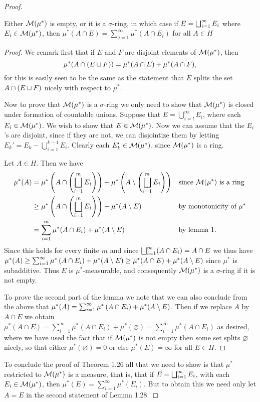\begin{proof}
\begin{lemma}
Either ${\cal M}(\mu^*)$ is empty, or it is a $\sigma$-ring, in which case if $E=\bigsqcup_{i=1}^\infty E_i$ where $E_i\in{\cal M}(\mu^*)$, then $\mu^*(A \cap E)=\sum_{j=1}^\infty \mu^*(A \cap E_i)$ for all ${A} \in {H}$
\end{lemma}
\begin{proof}
We remark first that if $E$ and $F$ are disjoint elements of ${\cal M}(\mu^*)$, then $$\mu^*(A \cap(E \sqcup F))=\mu^*(A \cap E)+\mu^*(A \cap F),$$ for this is easily seen to be the same as the statement that $E$ splits the set $A \cap(E \sqcup F)$ nicely with respect to $\mu^*$.

Now to prove that ${\cal M}(\mu^*)$ is a $\sigma$-ring we only need to show that ${\cal M}(\mu^*)$ is closed under formation of countable unions. Suppose that $E=\bigcup_{i=l}^\infty E_i$, where each $E_i \in {\cal M}(\mu^*)$. We wish to show that $E \in {\cal M}(\mu^*)$. Now we can assume that the $E_i$'s are disjoint, since if they are not, we can disjointize them by letting $E_k'=E_k-\bigcup_{i=1}^{k-1} E_i$. Clearly each $E_{k}' \in {\cal M}(\mu^*)$, since ${\cal M}(\mu^*)$ is a ring.

Let $A \in {H}$. Then we have
\begin{align*}
    \mu^*(A)&=\mu^*\left(A\cap\left(\bigsqcup_{i=1}^mE_i\right)\right)+\mu^*\left(A\setminus\left(\bigsqcup_{i=1}^mE_i\right)\right)& &\text{since }{\cal M}(\mu^*)\text{ is a ring}\\
    &\geq\mu^*\left(A\cap\left(\bigsqcup_{i=1}^mE_i\right)\right)+\mu^*(A\setminus E)& &\text{by monotonicity of }\mu^*\\
    &=\sum_{i=1}^m \mu^*(A \cap E_i)+\mu^*(A\setminus E)& &\text{by lemma 1.}
\end{align*}
Since this holds for every finite $m$ and since $\bigsqcup_{i=1}^\infty(A \cap E_i)=A \cap E$ we thus have $\mu^*(A) \geq \sum_{i=1}^\infty \mu^*\left(A \cap E_i\right)+\mu^*(A\setminus E) \geq \mu^*(A \cap E)+\mu^*(A\setminus E)$ since $\mu^*$ is subadditive. Thus $E$ is $\mu^*$-measurable, and consequently ${\cal M}(\mu^*)$ is a $\sigma$-ring if it is not empty.

To prove the second part of the lemma we note that we can also conclude from the above that $\mu^*(A)=\sum_{i=1}^\infty \mu^*\left(A \cap E_i\right)+\mu^*(A\setminus E)$. Then if we replace $A$ by $A \cap E$ we obtain $\mu^*(A \cap E)=\sum_{i=1}^\infty \mu^*\left(A \cap E_i\right)+\mu^*(\varnothing)=\sum_{i=1}^\infty \mu^*\left(A \cap E_i\right)$ as desired, where we have used the fact that if ${\cal M}(\mu^*)$ is not empty then some set splits $\varnothing$ nicely, so that either $\mu^*(\varnothing)=0$ or else $\mu^*(E)=\infty$ for all $E \in H$.
\end{proof}

To conclude the proof of Theorem 1.26 all that we need to show is that $\mu^*$ restricted to ${\cal M}(\mu^*)$ is a measure, that is, that if $E=\bigsqcup_{i=1}^\infty E_i$, with each $E_i\in{\cal M}(\mu^*)$, then $\mu^*(E)=\sum_{i=1}^\infty \mu^*(E_i)$. But to obtain this we need only let $A=E$ in the second statement of Lemma 1.28.
\end{proof}

